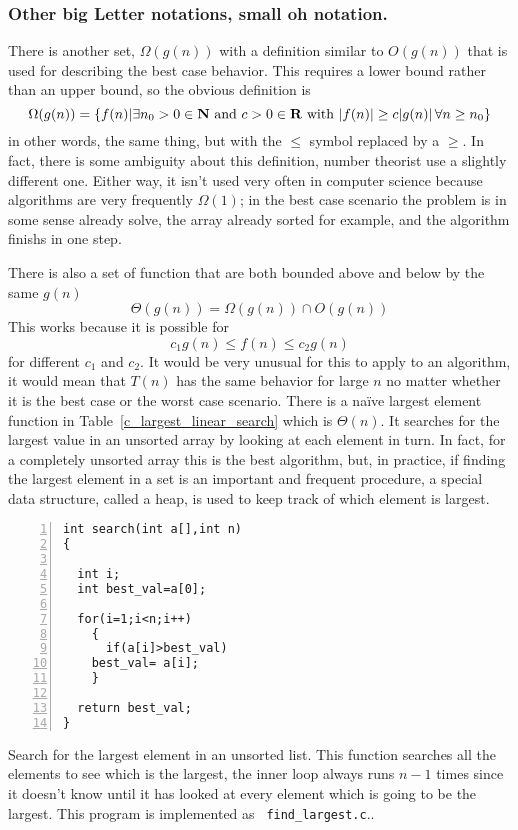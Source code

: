 \documentclass[11pt,a4paper]{scrartcl}
\begin{document}
\subsubsection*{Other big Letter notations, small oh notation.}

There is another set, $\Omega(g(n))$ with a definition similar to
$O(g(n))$ that is used for describing the best case behavior. This
requires a lower bound rather than an upper bound, so the obvious
definition is
\begin{equation}
\Omega(g(n))=\{f(n)| \exists n_0>0\in {\bf N}\mbox{ and }c>0\in {\bf R}\mbox{ with }|f(n)|\ge c|g(n)|\,\forall n\ge n_0\}
\end{equation}
in other words, the same thing, but with the $\le$ symbol replaced by
a $\ge$. In fact, there is some ambiguity about this definition,
number theorist use a slightly different one. Either way, it isn't
used very often in computer science because algorithms are very
frequently $\Omega(1)$; in the best case scenario the problem is in
some sense already solve, the array already sorted for example, and
the algorithm finishs in one step. 

There is also a set of function that are both bounded above and below
by the same $g(n)$
\begin{equation}
\Theta(g(n))=\Omega(g(n))\cap O(g(n))
\end{equation}
This works because it is possible for
\begin{equation}
c_1 g(n)\le f(n)\le c_2g(n)
\end{equation}
for different $c_1$ and $c_2$. It would be very unusual for this to
apply to an algorithm, it would mean that $T(n)$ has the same behavior
for large $n$ no matter whether it is the best case or the worst case
scenario. There is a na\"ive largest element function in
Table~\ref{c_largest_linear_search} which is $\Theta(n)$. It searches
for the largest value in an unsorted array by looking at each element
in turn. In fact, for a completely unsorted array this is the best
algorithm, but, in practice, if finding the largest element in a set
is an important and frequent procedure, a special data structure,
called a heap, is used to keep track of which element is largest.

\begin{table}
\begin{lstlisting}[numbers=left]
int search(int a[],int n)
{

  int i;
  int best_val=a[0];

  for(i=1;i<n;i++)
    {
      if(a[i]>best_val)
	best_val= a[i];
    }

  return best_val;
}
\end{lstlisting}
\caption{Search for the largest element in an unsorted list. This
  function searches all the elements to see which is the largest, the
  inner loop always runs $n-1$ times since it doesn't know until it
  has looked at every element which is going to be the largest. This
  program is implemented as {\tt
    find\_largest.c}.\label{c_largest_linear_search}.}
\end{table}
\end{document}
